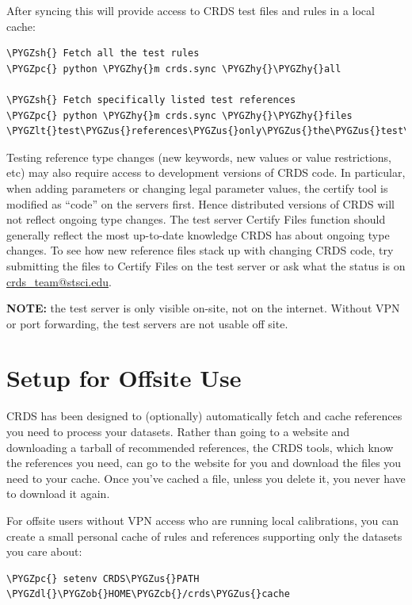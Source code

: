 \documentclass[letterpaper,10pt,english]{sphinxmanual}
\def\PYGZus{\char`\_}
\def\PYGZob{\char`\{}
\def\PYGZcb{\char`\}}
\def\PYGZlt{\char`\<}
\def\PYGZgt{\char`\>}
\def\PYGZsh{\char`\#}
\def\PYGZpc{\char`\%}
\def\PYGZdl{\char`\$}
\def\PYGZhy{\char`\-}
\begin{document}
After syncing this will provide access to CRDS test files and rules in a local cache:

\begin{Verbatim}[commandchars=\\\{\}]
\PYGZsh{} Fetch all the test rules
\PYGZpc{} python \PYGZhy{}m crds.sync \PYGZhy{}\PYGZhy{}all

\PYGZsh{} Fetch specifically listed test references
\PYGZpc{} python \PYGZhy{}m crds.sync \PYGZhy{}\PYGZhy{}files \PYGZlt{}test\PYGZus{}references\PYGZus{}only\PYGZus{}the\PYGZus{}test\PYGZus{}server\PYGZus{}has...\PYGZgt{}
\end{Verbatim}

Testing reference type changes (new keywords,  new values or value restrictions, etc) may also require access to
development versions of CRDS code.   In particular,  when adding parameters or changing legal parameter values,
the certify tool is modified as ``code'' on the servers first.   Hence distributed versions of CRDS will not reflect
ongoing type changes.   The test server Certify Files function should generally reflect the most up-to-date knowledge
CRDS has about ongoing type changes.  To see how new reference files stack up with changing CRDS code,  try submitting
the files to Certify Files on the test server or ask what the status is on \href{mailto:crds\_team@stsci.edu}{crds\_team@stsci.edu}.

\textbf{NOTE:} the test server is only visible on-site,  not on the internet.  Without VPN or port forwarding,  the test
servers are not usable off site.


\section{Setup for Offsite Use}
\label{installation:setup-for-offsite-use}
CRDS has been designed to (optionally) automatically fetch and cache references you need to process your datasets.
Rather than going to a website and downloading a tarball of recommended references,  the CRDS tools,  which know
the references you need,  can go to the website for you and download the files you need to your cache.  Once you've
cached a file,  unless you delete it,  you never have to download it again.

For offsite users without VPN access who are running local calibrations,  you can create a small personal
cache of rules and references supporting only the datasets you care about:

\begin{Verbatim}[commandchars=\\\{\}]
\PYGZpc{} setenv CRDS\PYGZus{}PATH  \PYGZdl{}\PYGZob{}HOME\PYGZcb{}/crds\PYGZus{}cache
\end{Verbatim}
\end{document}
